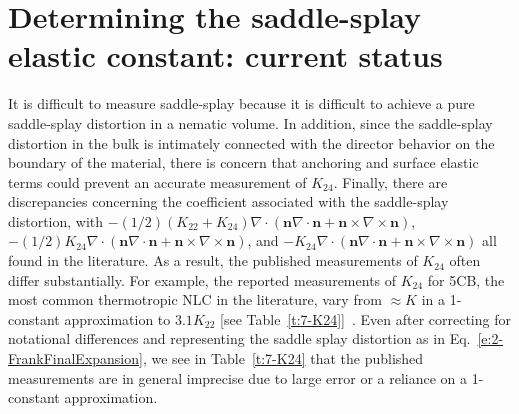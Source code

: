 \section{Determining the saddle-splay elastic constant: current status}
It is difficult to measure saddle-splay because it is difficult to achieve a pure saddle-splay distortion in a nematic volume.
In addition, since the saddle-splay distortion in the bulk is intimately connected with the director behavior on the boundary of the material, there is concern that anchoring and surface elastic terms could prevent an accurate measurement of $K_{24}$.
Finally, there are discrepancies concerning the coefficient associated with the saddle-splay distortion, with
$-(1/2)(K_{22} + K_{24})\nabla \cdot (\mathbf{n}\nabla \cdot \mathbf{n} + \mathbf{n} \times \nabla \times \mathbf{n})$,
$-(1/2)K_{24}\nabla \cdot (\mathbf{n}\nabla \cdot \mathbf{n} + \mathbf{n} \times \nabla \times \mathbf{n})$,
and $-K_{24}\nabla \cdot (\mathbf{n}\nabla \cdot \mathbf{n} + \mathbf{n} \times \nabla \times \mathbf{n})$ all found in the literature.
As a result, the published measurements of $K_{24}$ often differ substantially.
For example, the reported measurements of $K_{24}$ for 5CB, the most common thermotropic NLC in the literature, vary from $\approx K$ in a 1-constant approximation  to $3.1 K_{22}$ [see Table~\ref{t:7-K24}]~\cite{RN24,allender1991determination,polak1994optical,sparavigna1994periodic}.
Even after correcting for notational differences and representing the saddle splay distortion as in Eq.~\ref{e:2-FrankFinalExpansion}, we see in Table~\ref{t:7-K24} that the published measurements are in general imprecise due to large error or a reliance on a 1-constant approximation.
